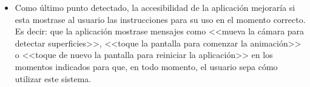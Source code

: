 \documentclass{subfiles}
\begin{document}
\begin{itemize}
        \item Como último punto detectado, la accesibilidad de la aplicación mejoraría si esta mostrase al usuario las instrucciones para su uso en el momento correcto. Es decir: que la aplicación mostrase mensajes como <<mueva la cámara para detectar superficies>>, <<toque la pantalla para comenzar la animación>> o <<toque de nuevo la pantalla para reiniciar la aplicación>> en los momentos indicados para que, en todo momento, el usuario sepa cómo utilizar este sistema.
    \end{itemize}
\end{document}
